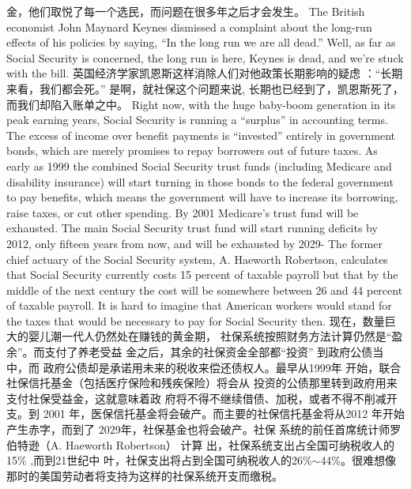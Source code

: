 \begin{paracol}{2}
金，他们取悦了每一个选民，而问题在很多年之后才会发生。
\switchcolumn*
The British economist John Maynard Keynes dismissed a
complaint about the long-run effects of his policies by saying,
``In the long run we are all dead.'' Well, as far as Social Security
is concerned, the long run is here, Keynes is dead, and we're
stuck with the bill.
\switchcolumn
英国经济学家凯恩斯这样消除人们对他政策长期影响的疑虑 ：“长期来看，我们都会死。” 是啊，就社保这个问题来说,
长期也已经到了，凯恩斯死了，而我们却陷入账单之中。
\switchcolumn*
Right now, with the huge baby-boom generation in its peak
earning years, Social Security is running a ``surplus'' in accounting terms. The excess of income over benefit payments is ``invested'' entirely in government bonds, which are merely
promises to repay borrowers out of future taxes. As early as
1999 the combined Social Security trust funds (including
Medicare and disability insurance) will start turning in those
bonds to the federal government to pay benefits, which means
the government will have to increase its borrowing, raise taxes,
or cut other spending. By 2001 Medicare's trust fund will be
exhausted. The main Social Security trust fund will start running deficits by 2012, only fifteen years from now, and will be exhausted by 2029- The former chief actuary of the Social Security system, A. Haeworth Robertson, calculates that Social Security currently costs 15 percent of taxable payroll but that by
the middle of the next century the cost will be somewhere between 26 and 44 percent of taxable payroll. It is hard to imagine that American workers would stand for the taxes that would
be necessary to pay for Social Security then.
\switchcolumn
现在，数量巨大的婴儿潮一代人仍然处在赚钱的黄金期，
社保系统按照财务方法计算仍然是“盈余”。而支付了养老受益
金之后，其余的社保资金全部都“投资” 到政府公债当中，而
政府公债却是承诺用未来的税收来偿还债权人。最早从1999年
开始，联合社保信托基金（包括医疗保险和残疾保险）将会从
投资的公债那里转到政府用来支付社保受益金，这就意味着政
府将不得不继续借债、加税，或者不得不削减开支。到 2001
年，医保信托基金将会破产。而主要的社保信托基金将从2012
年开始产生赤字，而到了 2029年，社保基金也将会破产。社保
系统的前任首席统计师罗伯特逊（A. Haeworth Robertson） 计算
出，社保系统支出占全国可纳税收人的15\% ,而到21世纪中
叶，社保支出将占到全国可纳税收人的26\%$\sim $44\%。很难想像
那时的美国劳动者将支持为这样的社保系统开支而缴税。
\end{paracol}

